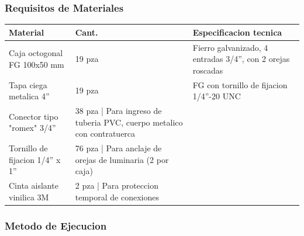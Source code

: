 \subsubsection{Requisitos de Materiales}

\begin{longtable}{L{5.0cm} L{2.0cm} L{7.5cm}}
\toprule
\textbf{Material} & \textbf{Cant.} & \textbf{Especificacion tecnica} \\
\midrule
Caja octogonal FG 100x50 mm & 19 pza & Fierro galvanizado, 4 entradas 3/4'', con 2 orejas roscadas \\
Tapa ciega metalica 4'' & 19 pza & FG con tornillo de fijacion 1/4''-20 UNC \\
Conector tipo "romex" 3/4'' & 38 pza | Para ingreso de tuberia PVC, cuerpo metalico con contratuerca \\
Tornillo de fijacion 1/4'' x 1'' & 76 pza | Para anclaje de orejas de luminaria (2 por caja) \\
Cinta aislante vinilica 3M & 2 pza | Para proteccion temporal de conexiones \\
\bottomrule
\end{longtable}

\subsubsection{Metodo de Ejecucion}

